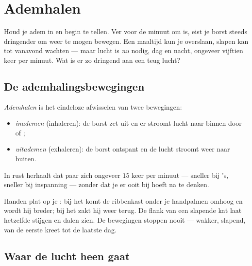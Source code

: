 \chapter{Ademhalen}\label{ch:g4:breathing}

Houd je adem in en begin te tellen. Ver voor de minuut om is, eist je
borst steeds dringender om weer te mogen bewegen. Een maaltijd kun je
overslaan, slapen kan tot vanavond wachten --- maar lucht is \emph{nu}
nodig, dag en nacht, ongeveer vijftien keer per minuut. Wat is er zo
dringend aan een teug lucht?

\section{De ademhalingsbewegingen}

\begin{definition}[In- en uitademen]\label{def:g4:breathing:movements}
\emph{Ademhalen} is het eindeloze afwisselen van twee
bewegingen:
\begin{itemize}
  \item \emph{inademen} (inhaleren): de borst zet uit en er stroomt
        lucht naar binnen door  of ;
  \item \emph{uitademen} (exhaleren): de borst ontspant en de lucht
        stroomt weer naar buiten.
\end{itemize}
In rust herhaalt dat paar zich ongeveer $15$ keer per minuut --- sneller
bij 's, sneller bij inspanning --- zonder dat je er ooit bij hoeft
na te denken.
\end{definition}

\begin{example}\label{ex:g4:breathing:watch}
Handen plat op je : bij het  komt de ribbenkast onder je
handpalmen omhoog en wordt hij breder; bij het  zakt hij weer
terug. De flank van een slapende kat laat hetzelfde stijgen en dalen
zien. De bewegingen stoppen nooit --- wakker, slapend, van de eerste
kreet tot de laatste dag.
\end{example}

\section{Waar de lucht heen gaat}

